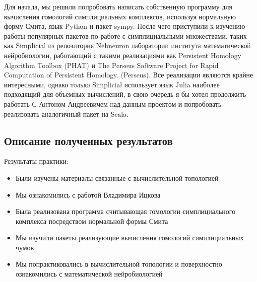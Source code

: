 Для начала, мы решили попробовать написать собственную программу для вычисления гомологий симплициальных комплексов, используя нормальную форму Смита, язык Python и пакет sympy. После чего приступили к изучению работы популярных пакетов по работе с симплициальными множествами, таких как Simplicial из репозитория Nebneuron лаборатории института математической нейробиологии, работающий с такими реализациями как  Persistent Homology Algorithm Toolbox (PHAT) и The Perseus Software Project for Rapid Computation of Persistent Homology. (Perseus). Все реализации являются крайне интересными, однако только Simplicial использует язык Julia наиболее подходящий для объемных вычислений, в свою очередь я бы хотел продолжить работать С Антоном Андреевичем над данным проектом и попробовать реализовать аналогичный пакет на Scala. 



\subsection{Описание полученных результатов}
Результаты практики:
\begin{itemize}
    \item Были изучены материалы связанные с вычислительной топологией
    \item Мы ознакомились с работой Владимира Ицкова
    \item Была реализована программа считывающая гомологии симплициального комплекса посредством нормальной формы Смита
    \item Мы изучили пакеты реализующие вычисления гомологий симплициальных чумов
    \item Мы попрактиковались в вычислительной топологии и поверхностно ознакомились с математической нейробиологией
\end{itemize}